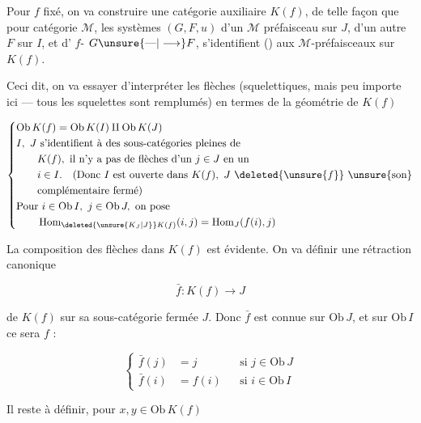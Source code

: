 Pour $f$ fixé, on va construire une catégorie auxiliaire $K(f)$, de telle façon que pour  catégorie $\mathcal M$, les systèmes $(G,F,u)$ d'un $\mathcal M$ préfaisceau  sur $J$, d'un autre $F$ sur $I$, et d' $f$- $G\unsure{\text{---}|\longrightarrow}F$, s'identifient () aux $\mathcal M$-préfaisceaux sur $K(f)$.

Ceci dit, on va essayer d'interpréter les flèches  (squelettiques, mais peu importe ici --- tous les squelettes sont  remplumés) en termes de la géométrie de $K(f)$

\[
\left\{\begin{aligned}
&\mathrm{Ob}\,K(f)=\mathrm{Ob}\,K(I)\amalg\mathrm{Ob}\,K(J)\\
&I,\ J\ \text{s'identifient à des sous-catégories pleines de}\\
&\qquad K(f),\ \text{il n'y a pas de flèches d'un }j\in J\text{ en un}\\
&\qquad i\in I.\quad(\text{Donc }I\text{ est ouverte dans }K(f),\ J\ \deleted{\unsure{f}}\ \text{\unsure{son}}\\
&\qquad\text{complémentaire fermé})\\
&\text{Pour }i\in\mathrm{Ob}\,I,\ j\in\mathrm{Ob}\,J,\ \text{on pose}\\
&\qquad\operatorname{Hom}_{\deleted{\unsure{K_J|J}}K(f)}(i,j)=\operatorname{Hom}_J(f(i),j)
\end{aligned}\right.
\]

La composition des flèches dans $K(f)$ est évidente. On va définir une rétraction canonique

\[
\bar f:K(f)\longrightarrow J
\]

de $K(f)$ sur sa sous-catégorie fermée $J$. Donc $\bar f$ est connue sur $\mathrm{Ob}\,J$, et sur $\mathrm{Ob}\,I$ ce sera $f$ :

\[
\left\{\begin{aligned}
\bar f(j)&=j&&\text{si }j\in\mathrm{Ob}\,J\\
\bar f(i)&=f(i)&&\text{si }i\in\mathrm{Ob}\,I
\end{aligned}\right.
\]

 Il reste à définir, pour $x,y\in\mathrm{Ob}\,K(f)$
